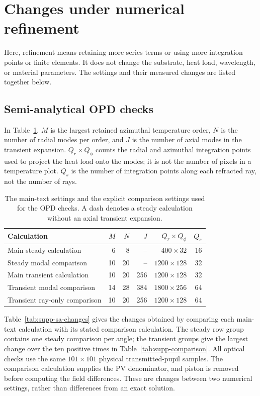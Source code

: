 \documentclass[9pt]{osa-supplemental-document}
\begin{document}
\section{Changes under numerical refinement}
Here, refinement means retaining more series terms or using more integration points or finite elements.
It does not change the substrate, heat load, wavelength, or material parameters.
The settings and their measured changes are listed together below.

\subsection*{Semi-analytical OPD checks}
In Table~\ref{tab:supp-sa-settings}, $M$ is the largest retained azimuthal temperature order, $N$ is the number of radial modes per order, and $J$ is the number of axial modes in the transient expansion.
$Q_r\times Q_\phi$ counts the radial and azimuthal integration points used to project the heat load onto the modes; it is not the number of pixels in a temperature plot.
$Q_s$ is the number of integration points along each refracted ray, not the number of rays.

\begin{table}[!htbp]\centering\small
\caption{The main-text settings and the explicit comparison settings used for the OPD checks. A dash denotes a steady calculation without an axial transient expansion.}\label{tab:supp-sa-settings}
\begin{tabular}{lrrrrr}\toprule
Calculation & $M$ & $N$ & $J$ & $Q_r\times Q_\phi$ & $Q_s$\\\midrule
Main steady calculation & 6 & 8 & -- & $400\times32$ & 16\\
Steady modal comparison & 10 & 20 & -- & $1200\times128$ & 32\\
Main transient calculation & 10 & 20 & 256 & $1200\times128$ & 32\\
Transient modal comparison & 14 & 28 & 384 & $1800\times256$ & 64\\
Transient ray-only comparison & 10 & 20 & 256 & $1200\times128$ & 64\\\bottomrule
\end{tabular}
\end{table}

Table~\ref{tab:supp-sa-changes} gives the changes obtained by comparing each main-text calculation with its stated comparison calculation.
The steady row group contains one steady comparison per angle; the transient groups give the largest change over the ten positive times in Table~\ref{tab:supp-comparison}.
All optical checks use the same $101\times101$ physical transmitted-pupil samples.
The comparison calculation supplies the PV denominator, and piston is removed before computing the field differences.
These are changes between two numerical settings, rather than differences from an exact solution.
\end{document}
